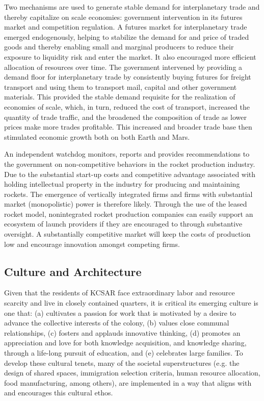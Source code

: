 \documentclass[fleqn,10pt]{Stylesheet} %
\begin{document}
Two mechanisms are used to generate stable demand for interplanetary trade and thereby capitalize on scale economies: government intervention in its futures market and competition regulation. A futures market for interplanetary trade emerged endogenously, helping to stabilize the demand for and price of traded goods and thereby enabling small and marginal producers to reduce their exposure to liquidity risk and enter the market. It also encouraged more efficient allocation of resources over time. The government intervened by providing a demand floor for interplanetary trade by consistently buying futures for freight transport and using them to transport mail, capital and other government materials. This provided the stable demand requisite for the realization of economies of scale, which, in turn, reduced the cost of transport, increased the quantity of trade traffic, and the broadened the composition of trade as lower prices make more trades profitable. This increased and broader trade base then stimulated economic growth both on both Earth and Mars.

An independent watchdog monitors, reports and provides recommendations to the government on non-competitive behaviors in the rocket production industry. Due to the substantial start-up costs and competitive advantage associated with holding intellectual property in the industry for producing and maintaining rockets. The emergence of vertically integrated firms and firms with substantial market (monopolistic) power is therefore likely. Through the use of the leased rocket model, nonintegrated rocket production companies can easily support an ecosystem of launch providers if they are encouraged to through substantive oversight. A substantially competitive market will keep the costs of production low and encourage innovation amongst competing firms.

\subsection{Culture and Architecture}

Given that the residents of KCSAR face extraordinary labor and resource scarcity and live in closely contained quarters, it is critical its emerging culture is one that: (a) cultivates a passion for work that is motivated by a desire to advance the collective interests of the colony, (b) values close communal relationships, (c) fosters and applauds innovative thinking, (d) promotes an appreciation and love for both knowledge acquisition, and knowledge sharing, through a life-long pursuit of education, and (e) celebrates large families. To develop these cultural tenets, many of the societal superstructures (e.g. the design of shared spaces, immigration selection criteria, human resource allocation, food manufacturing, among others), are implemented in a way that aligns with and encourages this cultural ethos.
\end{document}
